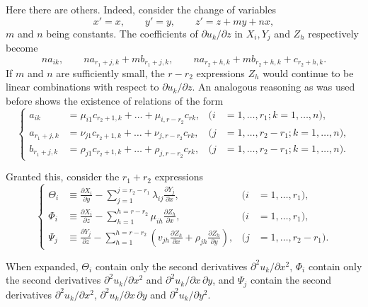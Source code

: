 \documentclass[leqno,11pt]{article}
\newcommand{\pd}{\partial}
\theoremstyle{shape1}
\theoremstyle{shape0}
\theoremstyle{shape2}
\theoremstyle{definition}
\begin{document}
Here there are others. Indeed, consider the change of variables
\[
x'=x,\qquad y'=y,\qquad z'=z+my+nx,
\]
$m$ and $n$ being constants. The coefficients of $\pd u_{k}/\pd z$ in $X_{i},Y_{j}$ and $Z_{h}$ respectively become
\[
na_{ik},\qquad na_{r_{1}+j,k}+mb_{r_{1}+j,k},\qquad n a_{r_{2}+h,k}+mb_{r_{2}+h,k}+c_{r_{2}+h,k}.
\]
If $m$ and $n$ are sufficiently small, the $r-r_{2}$ expressions $Z_{h}$ would continue to be linear combinations with respect to $\pd u_{k}/\pd z$. An analogous reasoning as was used before shows the existence of relations of the form
\begin{equation}
  \label{eq:7}
  \left\{
    \begin{aligned}
      a_{ik}&=\mu_{i1}c_{r_{2}+1,k}+\dots+\mu_{i,r-r_{2}}c_{rk},&(i&=1,\dots,r_{1};k=1,\dots,n),\\
      a_{r_{1}+j,k}&=\nu_{j1}c_{r_{2}+1,k}+\dots+\nu_{j,r-r_{2}}c_{rk},&(j&=1,\dots,r_{2}-r_{1};k=1,\dots,n),\\
      b_{r_{1}+j,k}&=\rho_{j1}c_{r_{2}+1,k}+\dots+\rho_{j,r-r_{2}}c_{rk},&(j&=1,\dots,r_{2}-r_{1};k=1,\dots,n).
    \end{aligned}
  \right.
\end{equation}

Granted this, consider the $r_{1}+r_{2}$ expressions
\begin{equation}
  \label{eq:8}
  \left\{
    \begin{aligned}
      \Theta_{i}&\equiv\frac{\pd X_{i}}{\pd y}-\sum_{j=1}^{j=r_{2}-r_{1}}\lambda_{ij}\frac{\pd Y_{j}}{\pd x},&(i&=1,\dots,r_{1}),\\
      \Phi_{i}&\equiv\frac{\pd X_{i}}{\pd z}-\sum_{h=1}^{h=r-r_{2}}\mu_{ih}\frac{\pd Z_{h}}{\pd x},&(i&=1,\dots,r_{1}),\\
      \Psi_{j}&\equiv\frac{\pd Y_{j}}{\pd z}-\sum_{h=1}^{h=r-r_{2}}\left(v_{jh}\frac{\pd Z_{h}}{\pd x}+\rho_{jh}\frac{\pd Z_{h}}{\pd y}\right),&(j&=1,\dots,r_{2}-r_{1}).
    \end{aligned}
  \right.
\end{equation}

When expanded, $\Theta_{i}$ contain only the second derivatives $\pd^{2}u_{k}/\pd x^{2}$, $\Phi_{i}$ contain only the second derivatives $\pd^{2}u_{k}/\pd x^{2}$ and $\pd^{2}u_{k}/\pd x\,\pd y$, and $\Psi_{j}$ contain the second derivatives $\pd^{2}u_{k}/\pd x^{2}$, $\pd^{2}u_{k}/\pd x\,\pd y$ and $\pd^{2}u_{k}/\pd y^{2}$.

\vspace{12pt}
\end{document}
